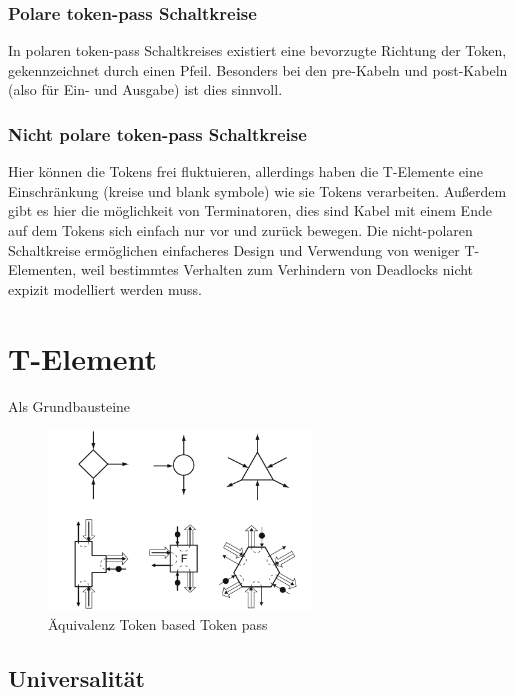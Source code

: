 \subsubsection{Polare token-pass Schaltkreise}
In polaren token-pass Schaltkreises existiert eine bevorzugte Richtung
der Token, gekennzeichnet durch einen Pfeil.
%
Besonders bei den pre-Kabeln und post-Kabeln (also für Ein- und Ausgabe)
ist dies sinnvoll.

\subsubsection{Nicht polare token-pass Schaltkreise}
Hier können die Tokens frei fluktuieren, allerdings haben die T-Elemente eine
Einschränkung (kreise und blank symbole) wie sie Tokens verarbeiten.
%
Außerdem gibt es hier die möglichkeit von Terminatoren, dies sind Kabel
mit einem Ende auf dem Tokens sich einfach nur vor und zurück bewegen.
%
Die nicht-polaren Schaltkreise ermöglichen einfacheres Design und Verwendung
von weniger T-Elementen, weil bestimmtes Verhalten zum Verhindern von
Deadlocks nicht expizit modelliert werden muss.

\section{T-Element}
Als Grundbausteine 

\begin{figure}[h]
    \centering
    \includegraphics[width=7cm]{bilder/BasedToPass.png}
    \caption{Äquivalenz Token based Token pass}
\end{figure}    

\subsection{Universalität}

